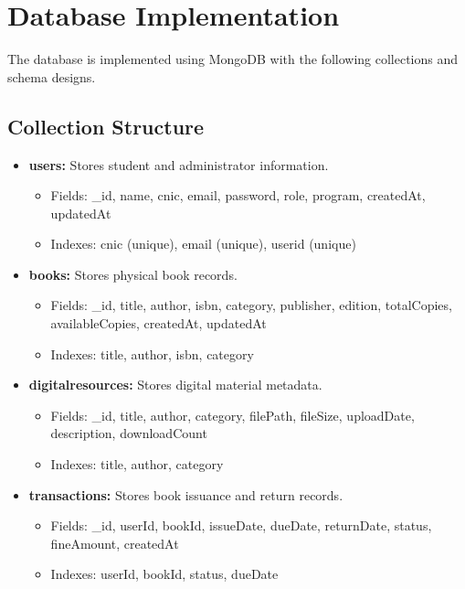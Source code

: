 \documentclass[12pt,a4paper]{report}
\begin{document}
\section{Database Implementation}
\label{sec:databaseimpl}

The database is implemented using MongoDB with the following collections and schema designs.

\subsection{Collection Structure}

\begin{itemize}
    \item \textbf{users:} Stores student and administrator information.
    \begin{itemize}
        \item Fields: \_id, name, cnic, email, password, role, program, createdAt, updatedAt
        \item Indexes: cnic (unique), email (unique), userid (unique)
    \end{itemize}
    
    \item \textbf{books:} Stores physical book records.
    \begin{itemize}
        \item Fields: \_id, title, author, isbn, category, publisher, edition, totalCopies, availableCopies, createdAt, updatedAt
        \item Indexes: title, author, isbn, category
    \end{itemize}
    
    \item \textbf{digitalresources:} Stores digital material metadata.
    \begin{itemize}
        \item Fields: \_id, title, author, category, filePath, fileSize, uploadDate, description, downloadCount
        \item Indexes: title, author, category
    \end{itemize}
    
    \item \textbf{transactions:} Stores book issuance and return records.
    \begin{itemize}
        \item Fields: \_id, userId, bookId, issueDate, dueDate, returnDate, status, fineAmount, createdAt
        \item Indexes: userId, bookId, status, dueDate
    \end{itemize}
    

\end{itemize}
\end{document}

